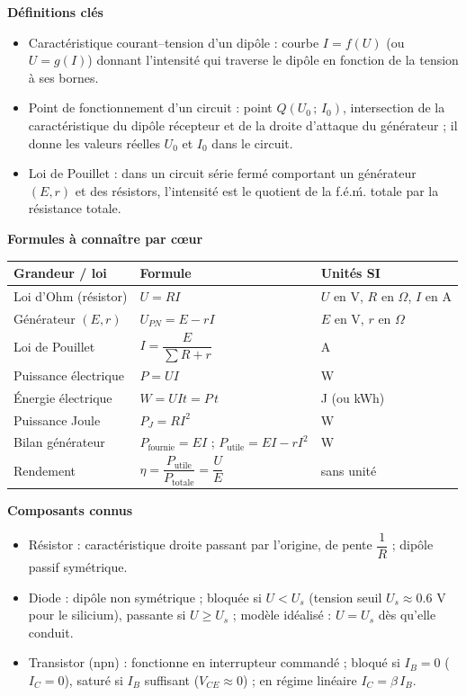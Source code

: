 \documentclass[11pt]{article}
\newcommand{\cle}[1]{{\popxbold\color{popdark}#1}}
\begin{document}
\begin{bilan}
\textbf{D\'efinitions cl\'es}
\begin{itemize}
  \item \cle{Caract\'eristique} courant--tension d'un dip\^ole : courbe $I=f(U)$ (ou $U=g(I)$) donnant l'intensit\'e qui traverse le dip\^ole en fonction de la tension \`a ses bornes.
  \item \cle{Point de fonctionnement} d'un circuit : point $Q(U_0\,;\,I_0)$, intersection de la caract\'eristique du dip\^ole r\'ecepteur et de la droite d'attaque du g\'en\'erateur ; il donne les valeurs r\'eelles $U_0$ et $I_0$ dans le circuit.
  \item \cle{Loi de Pouillet} : dans un circuit s\'erie ferm\'e comportant un g\'en\'erateur $(E,r)$ et des r\'esistors, l'intensit\'e est le quotient de la f.\'e.\'m. totale par la r\'esistance totale.
\end{itemize}

\textbf{Formules \`a conna\^itre par c\oe ur}
\begin{center}
\begin{tabularx}{\linewidth}{|l|X|l|}\hline
\rowcolor{popblueL} \textbf{Grandeur / loi} & \textbf{Formule} & \textbf{Unit\'es SI} \\ \hline
Loi d'Ohm (r\'esistor) & $U=RI$ & $U$ en V, $R$ en $\Omega$, $I$ en A \\ \hline
G\'en\'erateur $(E,r)$ & $U_{PN}=E-rI$ & $E$ en V, $r$ en $\Omega$ \\ \hline
Loi de Pouillet & $I=\dfrac{E}{\sum R + r}$ & A \\ \hline
Puissance \'electrique & $P=UI$ & W \\ \hline
\'Energie \'electrique & $W=UIt=P\,t$ & J (ou kWh) \\ \hline
Puissance Joule & $P_J=RI^2$ & W \\ \hline
Bilan g\'en\'erateur & $P_{\text{fournie}}=EI$ ; $P_{\text{utile}}=EI-rI^2$ & W \\ \hline
Rendement & $\eta=\dfrac{P_{\text{utile}}}{P_{\text{totale}}}=\dfrac{U}{E}$ & sans unit\'e \\ \hline
\end{tabularx}
\end{center}

\textbf{Composants connus}
\begin{itemize}
  \item \cle{R\'esistor} : caract\'eristique droite passant par l'origine, de pente $\dfrac{1}{R}$ ; dip\^ole passif sym\'etrique.
  \item \cle{Diode} : dip\^ole non sym\'etrique ; bloqu\'ee si $U<U_s$ (tension seuil $U_s\approx\num{0,6}$ V pour le silicium), passante si $U\geq U_s$ ; mod\`ele id\'ealis\'e : $U=U_s$ d\`es qu'elle conduit.
  \item \cle{Transistor} (npn) : fonctionne en interrupteur command\'e ; bloqu\'e si $I_B=0$ ($I_C=0$), satur\'e si $I_B$ suffisant ($V_{CE}\approx 0$) ; en r\'egime lin\'eaire $I_C=\beta\,I_B$.
\end{itemize}


\end{bilan}
\end{document}

